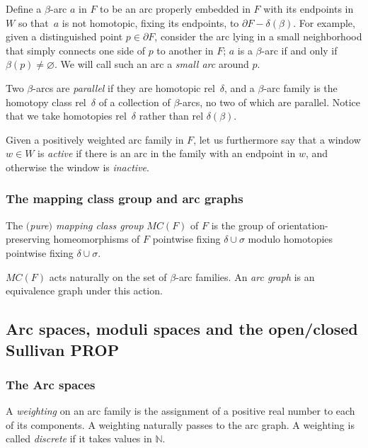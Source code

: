 Def\/ine a $\beta$-arc $a$ in $F$ to be an arc properly embedded in $F$ with its endpoints in $W$ so that~$a$ is not
homotopic, f\/ixing its endpoints, to $\partial F-\delta (\beta )$.  For example, given a distinguished point
$p\in\partial
F$, consider the arc lying in a small neighborhood that simply connects one side of $p$ to another in $F$; $a$ is
a $\beta$-arc if and only if
$\beta (p)\neq\varnothing$. We will call such an arc a {\it small arc} around $p$.

Two $\beta$-arcs are {\it parallel} if they are homotopic rel~$\delta$, and a $\beta$-arc family is the homotopy
class
rel~$\delta$ of a collection of $\beta$-arcs, no two of which are parallel.  Notice that we take homotopies rel~$\delta$
rather than
rel $\delta (\beta )$.





Given a positively weighted arc family in $F$, let us furthermore say that a window $w\in W$ is {\it active}
if there
is an arc in the family with an endpoint in $w$, and otherwise the window is {\it inactive}.



\subsubsection{The mapping class group and arc graphs}

The {\it $($pure$)$ mapping class group} $MC(F)$ of $F$ is the group of
orientation-preserving homeomorphisms of $F$ pointwise f\/ixing
$\delta\cup\sigma$ modulo homotopies pointwise f\/ixing $\delta\cup\sigma$.


$MC(F)$ acts naturally on the set of $\beta$-arc families.
An {\it arc graph} is an equivalence graph under this action.

\subsection{Arc spaces, moduli spaces and the open/closed Sullivan PROP}
\subsubsection{The Arc spaces}



A {\it  weighting} on an arc family is the assignment of
a positive  real number to each of its components.
A weighting naturally passes to the arc graph.
A weighting is called {\it discrete} if it takes values in ${\mathbb N}$.



